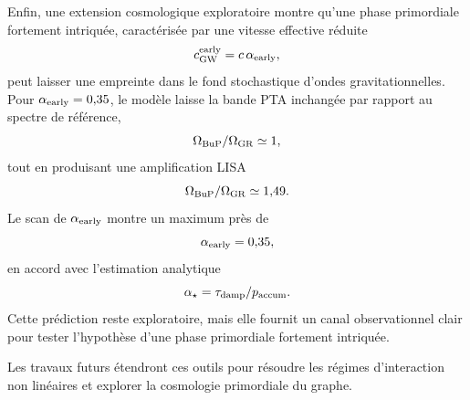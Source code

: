 \documentclass[11pt,a4paper]{article}
\begin{document}
Enfin, une extension cosmologique exploratoire montre qu'une phase primordiale
fortement intriquée, caractérisée par une vitesse effective réduite
\[
c_{\rm GW}^{\rm early}=c\,\alpha_{\rm early},
\]
peut laisser une empreinte dans le fond stochastique d'ondes gravitationnelles.
Pour \(\alpha_{\rm early}=0{,}35\), le modèle laisse la bande PTA inchangée par
rapport au spectre de référence,
\[
\Omega_{\rm BuP}/\Omega_{\rm GR}\simeq1,
\]
tout en produisant une amplification LISA
\[
\Omega_{\rm BuP}/\Omega_{\rm GR}\simeq1{,}49.
\]
Le scan de \(\alpha_{\rm early}\) montre un maximum près de
\[
\alpha_{\rm early}=0{,}35,
\]
en accord avec l'estimation analytique
\[
\alpha_\star=\tau_{\rm damp}/p_{\rm accum}.
\]
Cette prédiction reste exploratoire, mais elle fournit un canal observationnel
clair pour tester l'hypothèse d'une phase primordiale fortement intriquée.

Les travaux futurs étendront ces outils pour résoudre les régimes d'interaction
non linéaires et explorer la cosmologie primordiale du graphe.
\end{document}
